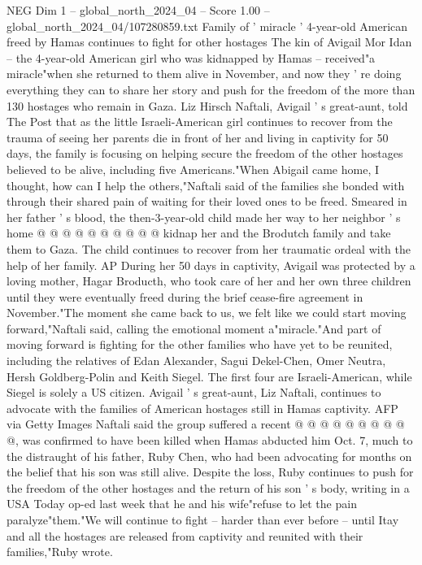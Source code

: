 \begin{textsample}{NEG Dim 1 – global\_north\_2024\_04 – Score 1.00 – global\_north\_2024\_04/107280859.txt}  \label{ex:f1_neg_251}
Family of ' miracle ' 4-year-old American freed by Hamas continues to fight for other hostages The kin of Avigail Mor Idan -- the 4-year-old American girl who was kidnapped by Hamas -- received"a miracle"when she returned to them alive in November, and now they ' re doing everything they can to share her story and push for the freedom of the more than 130 hostages who remain in Gaza.
Liz Hirsch Naftali, Avigail ' s great-aunt, told The Post that as the little Israeli-American girl continues to recover from the trauma of seeing her parents die in front of her and living in captivity for 50 days, the family is focusing on helping secure the freedom of the other hostages believed to be alive, including five Americans."When Abigail came home, I thought, how can I help the others,"Naftali said of the families she bonded with through their shared pain of waiting for their loved ones to be freed.
Smeared in her father ' s blood, the then-3-year-old child made her way to her neighbor ' s home @ @ @ @ @ @ @ @ @ @ kidnap her and the Brodutch family and take them to Gaza.
The child continues to recover from her traumatic ordeal with the help of her family.
AP During her 50 days in captivity, Avigail was protected by a loving mother, Hagar Broducth, who took care of her and her own three children until they were eventually freed during the brief cease-fire agreement in November."The moment she came back to us, we felt like we could start moving forward,"Naftali said, calling the emotional moment a"miracle."And part of moving forward is fighting for the other families who have yet to be reunited, including the relatives of Edan Alexander, Sagui Dekel-Chen, Omer Neutra, Hersh Goldberg-Polin and Keith Siegel.
The first four are Israeli-American, while Siegel is solely a US citizen.
Avigail ' s great-aunt, Liz Naftali, continues to advocate with the families of American hostages still in Hamas captivity.
AFP via Getty Images Naftali said the group suffered a recent @ @ @ @ @ @ @ @ @ @, was confirmed to have been killed when Hamas abducted him Oct. 7, much to the distraught of his father, Ruby Chen, who had been advocating for months on the belief that his son was still alive.
Despite the loss, Ruby continues to push for the freedom of the other hostages and the return of his son ' s body, writing in a USA Today op-ed last week that he and his wife"refuse to let the pain paralyze"them."We will continue to fight -- harder than ever before -- until Itay and all the hostages are released from captivity and reunited with their families,"Ruby wrote.

\end{textsample}
